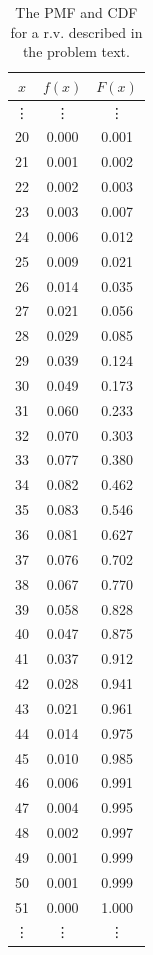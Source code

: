 \documentclass[12pt]{article}
\begin{document}
\begin{table}[h]
\centering
\begin{tabular}{ccc}
  \hline
$x$ & $f(x)$ & $F(x)$ \\ 
  \hline
\vdots & \vdots & \vdots \\
  20 & 0.000 & 0.001 \\ 
  21 & 0.001 & 0.002 \\ 
  22 & 0.002 & 0.003 \\ 
  23 & 0.003 & 0.007 \\ 
  24 & 0.006 & 0.012 \\ 
  25 & 0.009 & 0.021 \\ 
  26 & 0.014 & 0.035 \\ 
  27 & 0.021 & 0.056 \\ 
  28 & 0.029 & 0.085 \\ 
  29 & 0.039 & 0.124 \\ 
  30 & 0.049 & 0.173 \\ 
  31 & 0.060 & 0.233 \\ 
  32 & 0.070 & 0.303 \\ 
  33 & 0.077 & 0.380 \\ 
  34 & 0.082 & 0.462 \\ 
  35 & 0.083 & 0.546 \\ 
  36 & 0.081 & 0.627 \\ 
  37 & 0.076 & 0.702 \\ 
  38 & 0.067 & 0.770 \\ 
  39 & 0.058 & 0.828 \\ 
  40 & 0.047 & 0.875 \\ 
  41 & 0.037 & 0.912 \\ 
  42 & 0.028 & 0.941 \\ 
  43 & 0.021 & 0.961 \\ 
  44 & 0.014 & 0.975 \\ 
  45 & 0.010 & 0.985 \\ 
  46 & 0.006 & 0.991 \\ 
  47 & 0.004 & 0.995 \\ 
  48 & 0.002 & 0.997 \\ 
  49 & 0.001 & 0.999 \\ 
  50 & 0.001 & 0.999 \\ 
  51 & 0.000 & 1.000 \\
\vdots & \vdots & \vdots \\
   \hline
\end{tabular}
\caption{The PMF and CDF for a r.v. described in the problem text.}
\label{tab:pmfcdf}

\end{table}
\end{document}
